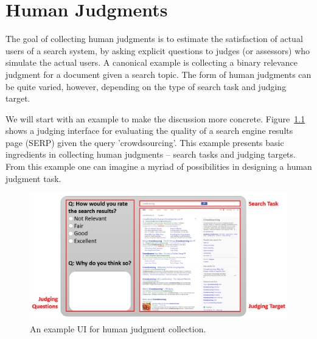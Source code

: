 
\chapter{Human Judgments}
\label{c-human-judgment}

The goal of collecting human judgments is to estimate the satisfaction of actual users of a search system, by asking explicit questions to judges (or assessors) who simulate the actual users.
A canonical example is collecting a binary relevance judgment for a document given a  search topic. The form of human judgments can be quite varied, however, depending on the type of search task and judging target.

We will start with an example to make the discussion more concrete. Figure~\ref{fig:human_judgment_overview} shows a judging interface for evaluating the quality of a search engine results page (SERP) given the query 'crowdsourcing'. This example presents basic ingredients in collecting human judgments -- search tasks and judging targets. From this example one can imagine a myriad of possibilities in designing a human judgment task. 




\begin{figure}
	\begin{center}
		\includegraphics[scale=0.5]{images/judging_interface}
		\caption{An example UI for human judgment collection.} 
		\label{fig:human_judgment_overview}
	\end{center}
\end{figure}


